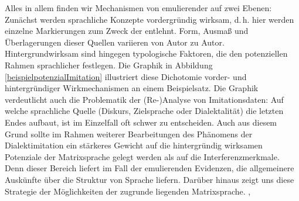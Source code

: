 \noindent Alles in allem finden wir Mechanismen von emulierender  auf zwei Ebenen: Zunächst werden sprachliche Konzepte vordergründig wirksam, d.\,h. hier werden einzelne Markierungen zum Zweck der  entlehnt. Form, Ausmaß und Überlagerungen dieser Quellen variieren von Autor zu Autor. Hintergrundwirksam sind hingegen typologische Faktoren, die den potenziellen Rahmen sprachlicher  festlegen. Die Graphik in Abbildung \ref{beispielpotenzialImitation} illustriert diese Dichotomie vorder- und hintergründiger Wirkmechanismen an einem Beispielsatz. Die Graphik verdeutlicht auch die Problematik der (Re-)Analyse von Imitationsdaten: Auf welche sprachliche Quelle (Diskurs, Zielsprache oder Dialektalität) die  letzten Endes aufbaut, ist im Einzelfall oft schwer zu entscheiden. Auch aus diesem Grund sollte im Rahmen weiterer Bearbeitungen des Phänomens der Dialektimitation ein stärkeres Gewicht auf die hintergründig wirksamen Potenziale der Matrixsprache gelegt werden als auf die Interferenzmerkmale. Denn dieser Bereich
liefert im Fall der emulierenden  Evidenzen, die allgemeinere Auskünfte über die Struktur von Sprache liefern. Darüber hinaus zeigt uns diese Strategie der  Möglichkeiten der zugrunde liegenden Matrixsprache. ,
